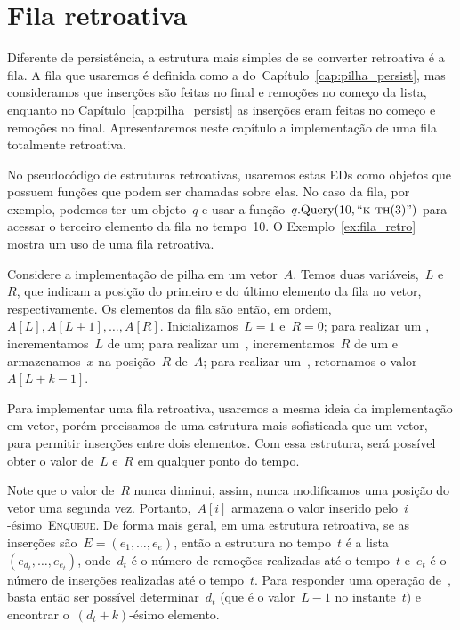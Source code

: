 \documentclass[main.tex]{subfiles}
\begin{document}
\chapter{Fila retroativa} \label{cap:pilha_retro}

Diferente de persistência, a estrutura mais simples de se converter retroativa é a fila. A fila que usaremos é definida como a do~Capítulo~\ref{cap:pilha_persist}, mas consideramos que inserções são feitas no final e remoções no começo da lista, enquanto no Capítulo~\ref{cap:pilha_persist} as inserções eram feitas no começo e remoções no final. Apresentaremos neste capítulo a implementação de uma fila totalmente retroativa.

No pseudocódigo de estruturas retroativas, usaremos estas EDs como objetos que possuem funções que podem ser chamadas sobre elas. No caso da fila, por exemplo, podemos ter um objeto~$q$ e usar a função~$q.\text{Query}(10, ``\textsc{k-th}(3)")$ para acessar o terceiro elemento da fila no tempo~10. O Exemplo~\ref{ex:fila_retro} mostra um uso de uma fila retroativa.

Considere a implementação de pilha em um vetor~$A$. Temos duas variáveis,~$L$ e~$R$, que indicam a posição do primeiro e do último elemento da fila no vetor, respectivamente. Os elementos da fila são então, em ordem,~$A[L], A[L + 1], \ldots, A[R]$. Inicializamos~$L = 1$ e~$R = 0$; para realizar um , incrementamos~$L$ de um; para realizar um~, incrementamos~$R$ de um e armazenamos~$x$ na posição~$R$ de~$A$; para realizar um~, retornamos o valor~$A[L + k - 1]$.

Para implementar uma fila retroativa, usaremos a mesma ideia da implementação em vetor, porém precisamos de uma estrutura mais sofisticada que um vetor, para permitir inserções entre dois elementos. Com essa estrutura, será possível obter o valor de~$L$ e~$R$ em qualquer ponto do tempo.

Note que o valor de~$R$ nunca diminui, assim, nunca modificamos uma posição do vetor uma segunda vez. Portanto,~$A[i]$ armazena o valor inserido pelo~$i$-ésimo~\textsc{Enqueue}. De forma mais geral, em uma estrutura retroativa, se as inserções são~$E = (e_1, \ldots, e_e)$, então a estrutura no tempo~$t$ é a lista~$(e_{d_t}, \ldots, e_{e_t})$, onde~$d_t$ é o número de remoções realizadas até o tempo~$t$ e~$e_t$ é o número de inserções realizadas até o tempo~$t$. Para responder uma operação de~, basta então ser possível determinar~$d_t$ (que é o valor~$L - 1$ no instante~$t$) e encontrar o~$(d_t + k)$-ésimo elemento.
\end{document}
